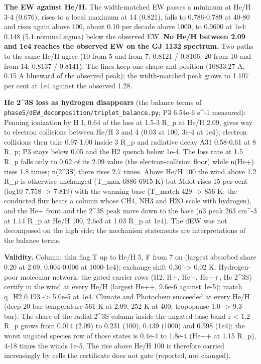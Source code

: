 \documentclass[english,a4paper]{my_memo}
\begin{document}
\textbf{The EW against He/H.} The width-matched EW passes a minimum at He/H 3-4
(0.676), rises to a local maximum at 14 (0.821), falls to 0.786-0.789 at
40-80 and rises again above 100, about 0.10 per decade above 1000, to 0.9600
at 1e4: 0.148 (5.1 nominal sigma) below the observed EW. \textbf{No He/H between
2.09 and 1e4 reaches the observed EW on the GJ 1132 spectrum.} Two paths
to the same He/H agree (10 from 5 and from 7: 0.8121 / 0.8106; 20 from 10
and from 14: 0.8137 / 0.8141). The lines keep one shape and position
(10833.27 A, 0.15 A blueward of the observed peak); the width-matched peak
grows to 1.107 per cent at 1e4 against the observed 1.28.

\textbf{He 2\^{}3S loss as hydrogen disappears} (the balance terms of
\texttt{phase5/dEW\_decomposition/triplet\_balance.py}; P3 6.54e-6 s\^{}-1 measured):
Penning ionization by H I, 0.64 of the loss at 1.5-3 R\_p at He/H 2.09, gives
way to electron collisions between He/H 3 and 4 (0.03 at 100, 3e-4 at 1e4);
electron collisions then take 0.97-1.00 inside 3 R\_p and radiative decay
A31 0.58-0.61 at 8 R\_p; P3 stays below 0.05 and the H2 quench below 1e-4.
The loss rate at 1.5 R\_p falls only to 0.62 of its 2.09 value (the
electron-collision floor) while n(He+) rises 1.8 times; n(2\^{}3S) there rises
2.7 times. Above He/H 100 the wind above 1.2 R\_p is otherwise unchanged
(T\_max 6886-6915 K) but Mdot rises 15 per cent (log10 7.758 -\textgreater{} 7.819) with
the warming base (T\_match 429 -\textgreater{} 856 K: the conducted flux heats a column
whose CH4, NH3 and H2O scale with hydrogen), and the He+ front and the 2\^{}3S
peak move down to the base (n3 peak 263 cm\^{}-3 at 1.14 R\_p at He/H 100,
2.6e3 at 1.03 R\_p at 1e4). The dEW was not decomposed on the high side; the
mechanism statements are interpretations of the balance terms.

\textbf{Validity.} Column: thin flag T up to He/H 5, F from 7 on (largest
absorbed share 0.20 at 2.09, 0.004-0.006 at 1000-1e4); exchange shift
0.36 -\textgreater{} 0.02 K. Hydrogen-poor molecular network: the gated carrier rows
(H2, H+, He+, He++, He 2\^{}3S) certify in the wind at every He/H (largest
He++, 9.6e-6 against 1e-5); match q\_H2 0.193 -\textgreater{} 5.0e-5 at 1e4. Climate and
Photochem succeeded at every He/H (deep 20-bar temperature 561 K at 2.09,
252 K at 400; tropopause 1.0 -\textgreater{} 9.3 bar). The share of the radial 2\^{}3S
column inside the ungated base band r \textless{} 1.2 R\_p grows from 0.014 (2.09) to
0.231 (100), 0.439 (1000) and 0.598 (1e4); the worst ungated species row of
those states is 0.4e-4 to 1.8e-4 (He++ at 1.15 R\_p), 4-18 times the wind\textquotesingle s
1e-5. The rise above He/H 100 is therefore carried increasingly by cells
the certificate does not gate (reported, not changed).
\end{document}
